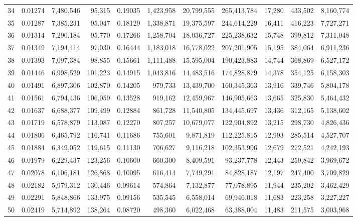 \begin{landscape}
\begin{longtable}{rrrrrrrrrrr}
34 & 0.01274 & 7,480,546 & 95,315 & 0.19035 & 1,423,958 & 20,799,555 & 265,413,784 & 17,280 & 433,502 & 8,160,774 \\
35 & 0.01287 & 7,385,231 & 95,047 & 0.18129 & 1,338,871 & 19,375,597 & 244,614,229 & 16,411 & 416,223 & 7,727,271 \\
36 & 0.01314 & 7,290,184 & 95,770 & 0.17266 & 1,258,704 & 18,036,727 & 225,238,632 & 15,748 & 399,812 & 7,311,048 \\
37 & 0.01349 & 7,194,414 & 97,030 & 0.16444 & 1,183,018 & 16,778,022 & 207,201,905 & 15,195 & 384,064 & 6,911,236 \\
38 & 0.01393 & 7,097,384 & 98,855 & 0.15661 & 1,111,488 & 15,595,004 & 190,423,883 & 14,744 & 368,869 & 6,527,172 \\
39 & 0.01446 & 6,998,529 & 101,223 & 0.14915 & 1,043,816 & 14,483,516 & 174,828,879 & 14,378 & 354,125 & 6,158,303 \\
40 & 0.01491 & 6,897,306 & 102,870 & 0.14205 & 979,733 & 13,439,700 & 160,345,363 & 13,916 & 339,746 & 5,804,178 \\
41 & 0.01561 & 6,794,436 & 106,059 & 0.13528 & 919,162 & 12,459,967 & 146,905,663 & 13,665 & 325,830 & 5,464,432 \\
42 & 0.01637 & 6,688,377 & 109,499 & 0.12884 & 861,728 & 11,540,805 & 134,445,697 & 13,436 & 312,165 & 5,138,602 \\
43 & 0.01719 & 6,578,879 & 113,087 & 0.12270 & 807,257 & 10,679,077 & 122,904,892 & 13,215 & 298,730 & 4,826,436 \\
44 & 0.01806 & 6,465,792 & 116,741 & 0.11686 & 755,601 & 9,871,819 & 112,225,815 & 12,993 & 285,514 & 4,527,707 \\
45 & 0.01884 & 6,349,052 & 119,615 & 0.11130 & 706,627 & 9,116,218 & 102,353,996 & 12,679 & 272,521 & 4,242,193 \\
46 & 0.01979 & 6,229,437 & 123,256 & 0.10600 & 660,300 & 8,409,591 & 93,237,778 & 12,443 & 259,842 & 3,969,672 \\
47 & 0.02078 & 6,106,181 & 126,868 & 0.10095 & 616,414 & 7,749,291 & 84,828,187 & 12,197 & 247,400 & 3,709,829 \\
48 & 0.02182 & 5,979,312 & 130,446 & 0.09614 & 574,864 & 7,132,877 & 77,078,895 & 11,944 & 235,202 & 3,462,429 \\
49 & 0.02291 & 5,848,866 & 133,975 & 0.09156 & 535,545 & 6,558,014 & 69,946,018 & 11,683 & 223,258 & 3,227,227 \\
50 & 0.02419 & 5,714,892 & 138,264 & 0.08720 & 498,360 & 6,022,468 & 63,388,004 & 11,483 & 211,575 & 3,003,968 \\

\end{longtable}
\end{landscape}
